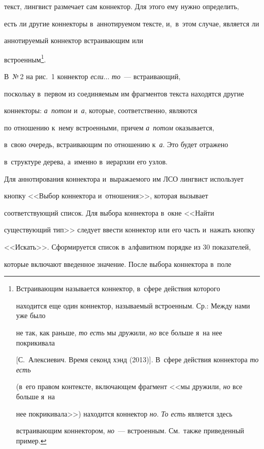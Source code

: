 текст, лингвист размечает сам коннектор. Для этого ему нужно определить, 


есть ли другие коннекторы в~аннотируемом текс\-те, и,~в~этом случае, является ли 


аннотируемый коннектор встраивающим или 


встроенным\footnote{Встраивающим называется коннектор, в~сфере действия которого 


находится еще один коннектор, называемый встроенным. Ср.: Между нами уже было 


не так, как раньше, \textit{то есть} мы дружили, \textit{но} все больше я~на нее покрикивала 


[С.~Алексиевич. Время секонд хэнд (2013)]. В~сфере действия коннектора \textit{то есть} 


(в~его правом контексте, вклю\-ча\-ющем фрагмент <<мы дружили, \textit{но} все больше я~на 


нее покрикивала>>) находится коннектор \textit{но}. \textit{То есть} является здесь 


встраивающим коннектором, \textit{но}~--- встроенным. См.\ также приведенный пример.}. 


В~№\,2 на рис.~1 коннектор \textit{если}$\ldots$ \textit{то}~--- встраивающий, 


поскольку в~первом из соединяемым им фрагментов текс\-та находятся другие 


коннекторы: \textit{а~потом} и~\textit{а}, которые, соответственно, являются 


по отношению к~нему встроенными, причем \textit{а~потом} оказывается, 


в~свою очередь, встра\-и\-ва\-ющим по отношению к~\textit{а}. Это будет отражено 


в~структуре дерева, а~именно в~иерархии его узлов. 


  


  Для аннотирования коннектора и~выражаемого им ЛСО лингвист использует 


кнопку <<Выбор коннектора и~отношения>>, которая вызывает 


соответствующий список. Для выбора коннектора в~окне <<Найти 


существующий тип>> следует ввести коннектор или его часть и~нажать кнопку 


<<Искать>>. Сформируется список в~алфавитном порядке из 30 показателей, 


которые включают введенное значение. После выбора коннектора в~поле 


